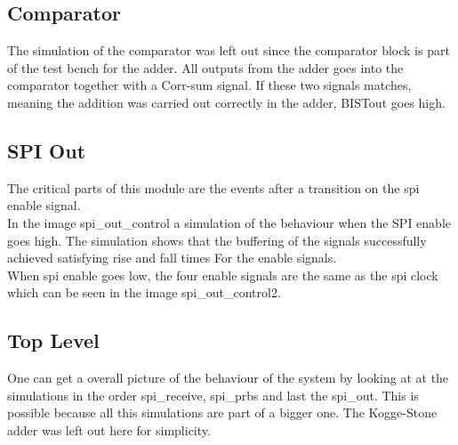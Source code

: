 \subsection{Comparator}
The simulation of the comparator was left out since the comparator block is part of the test bench for the adder. All outputs from the adder goes into the comparator together with a Corr-sum signal. If these two signals matches, meaning the addition was carried out correctly in the adder, BISTout goes high.

\subsection{SPI Out}
The critical parts of this module are the events after a transition on the spi enable signal.\\

In the image spi\_out\_control a simulation of the behaviour when the SPI enable goes high. The simulation shows that the buffering of the signals successfully achieved satisfying rise and fall times For the enable signals.\\

When spi enable goes low, the four enable signals are the same as the spi clock which can be seen in the image spi\_out\_control2. \\

\subsection{Top Level}
One can get a overall picture of the behaviour of the system by looking at at the simulations in the order spi\_receive, spi\_prbs and last the spi\_out. This is possible because all this simulations are part of a bigger one. The Kogge-Stone adder was left out here for simplicity.
